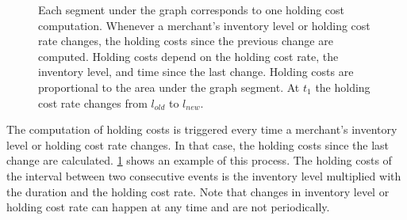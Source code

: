 \begin{figure}[t]
\centering
{}
\caption[Visualized Calculation of Holding Costs]{
Each segment under the graph corresponds to one holding cost computation.
Whenever a merchant's inventory level or holding cost rate changes, the holding costs since the previous change are computed.
Holding costs depend on the holding cost rate, the inventory level, and time since the last change.
Holding costs are proportional to the area under the graph segment.
At $t_1$ the holding cost rate changes from $l_{old}$ to $l_{new}$.}
\label{fig:holding_cost}
\end{figure}

The computation of holding costs is triggered every time a merchant's inventory level or holding cost rate changes.
In that case, the holding costs since the last change are calculated.
\cref{fig:holding_cost} shows an example of this process.
The holding costs of the interval between two consecutive events is the inventory level multiplied with the duration and the holding cost rate.
Note that changes in inventory level or holding cost rate can happen at any time and are not periodically.


